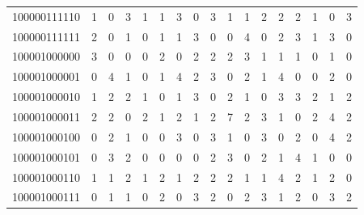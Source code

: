 \documentclass[10pt,a4paper]{article}
\begin{document}
\begin{longtable}{ |c|c|c|c|c|c|c|c|c|c|c|c|c|c|c|c|c| }
    100000111110              & 1                            & 0                                & 3                            & 1                              & 1   & 3   & 0   & 3   & 1   & 1   & 2   & 2   & 2   & 1   & 0   & 3   \\
    100000111111              & 2                            & 0                                & 1                            & 0                              & 1   & 1   & 3   & 0   & 0   & 4   & 0   & 2   & 3   & 1   & 3   & 0   \\
    100001000000              & 3                            & 0                                & 0                            & 0                              & 2   & 0   & 2   & 2   & 2   & 3   & 1   & 1   & 1   & 0   & 1   & 0   \\
    100001000001              & 0                            & 4                                & 1                            & 0                              & 1   & 4   & 2   & 3   & 0   & 2   & 1   & 4   & 0   & 0   & 2   & 0   \\
    100001000010              & 1                            & 2                                & 2                            & 1                              & 0   & 1   & 3   & 0   & 2   & 1   & 0   & 3   & 3   & 2   & 1   & 2   \\
    100001000011              & 2                            & 2                                & 0                            & 2                              & 1   & 2   & 1   & 2   & 7   & 2   & 3   & 1   & 0   & 2   & 4   & 2   \\
    100001000100              & 0                            & 2                                & 1                            & 0                              & 0   & 3   & 0   & 3   & 1   & 0   & 3   & 0   & 2   & 0   & 4   & 2   \\
    100001000101              & 0                            & 3                                & 2                            & 0                              & 0   & 0   & 0   & 2   & 3   & 0   & 2   & 1   & 4   & 1   & 0   & 0   \\
    100001000110              & 1                            & 1                                & 2                            & 1                              & 2   & 1   & 2   & 2   & 2   & 1   & 1   & 4   & 2   & 1   & 2   & 0   \\
    100001000111              & 0                            & 1                                & 1                            & 0                              & 2   & 0   & 3   & 2   & 0   & 2   & 3   & 1   & 2   & 0   & 3   & 2   \\

\end{longtable}
\end{document}
